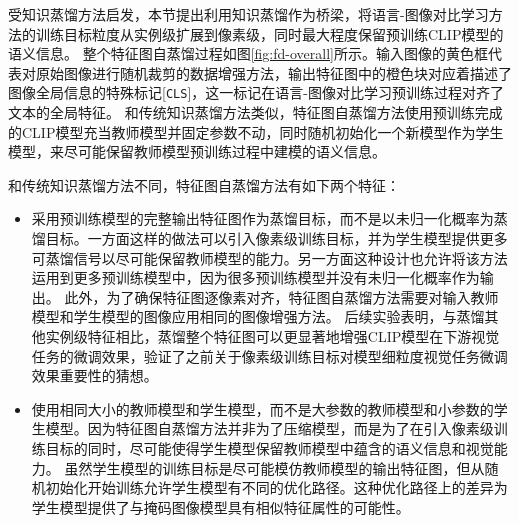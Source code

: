 受知识蒸馏方法启发，本节提出利用知识蒸馏作为桥梁，将语言-图像对比学习方法的训练目标粒度从实例级扩展到像素级，同时最大程度保留预训练CLIP模型的语义信息。
整个特征图自蒸馏过程如图\ref{fig:fd-overall}所示。输入图像的黄色框代表对原始图像进行随机裁剪的数据增强方法，输出特征图中的橙色块对应着描述了图像全局信息的特殊标记[\texttt{CLS}]，这一标记在语言-图像对比学习预训练过程对齐了文本的全局特征。
和传统知识蒸馏方法类似，特征图自蒸馏方法使用预训练完成的CLIP模型充当教师模型并固定参数不动，同时随机初始化一个新模型作为学生模型，来尽可能保留教师模型预训练过程中建模的语义信息。%

和传统知识蒸馏方法不同，特征图自蒸馏方法有如下两个特征：
\begin{itemize}
    \item 采用预训练模型的完整输出特征图作为蒸馏目标，而不是以未归一化概率为蒸馏目标\cite{hinton2015knowledge,deit}。一方面这样的做法可以引入像素级训练目标，并为学生模型提供更多可蒸馏信号以尽可能保留教师模型的能力。另一方面这种设计也允许将该方法运用到更多预训练模型中，因为很多预训练模型\cite{dino}并没有未归一化概率作为输出。
    此外，为了确保特征图逐像素对齐，特征图自蒸馏方法需要对输入教师模型和学生模型的图像应用相同的图像增强方法。
    后续实验表明，与蒸馏其他实例级特征相比，蒸馏整个特征图可以更显著地增强CLIP模型在下游视觉任务的微调效果，验证了之前关于像素级训练目标对模型细粒度视觉任务微调效果重要性的猜想。
    \item 使用相同大小的教师模型和学生模型，而不是大参数的教师模型和小参数的学生模型。因为特征图自蒸馏方法并非为了压缩模型，而是为了在引入像素级训练目标的同时，尽可能使得学生模型保留教师模型中蕴含的语义信息和视觉能力。
    虽然学生模型的训练目标是尽可能模仿教师模型的输出特征图，但从随机初始化开始训练允许学生模型有不同的优化路径。这种优化路径上的差异为学生模型提供了与掩码图像模型具有相似特征属性的可能性。
\end{itemize}


